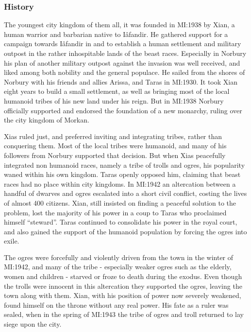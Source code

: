 \subsubsection{History}

The youngest city kingdom of them all, it was founded in MI:1938 by Xian, a
human warrior and barbarian native to Iâfandir. He gathered support for a
campaign towards Iâfandir in  and 
to establish a human settlement and military outpost in the rather
inhospitable lands of the beast races. Especially in Norbury his plan of
another military outpost against the invasion was well received, and liked
among both nobility and the general populace. He sailed from the shores of
Norbury with his friends and allies Arissa, and Taras in MI:1930. It took Xian
eight years to build a small settlement, as well as bringing most of the local
humanoid tribes of his new land under his reign. But in MI:1938 Norbury
officially supported and endorsed the foundation of a new monarchy, ruling
over the city kingdom of Morkan.

Xias ruled just, and preferred inviting and integrating tribes, rather than
conquering them. Most of the local tribes were humanoid, and many of his
followers from Norbury supported that decision. But when Xias peacefully
integrated non humanoid races, namely a tribe of trolls and ogres, his
popularity waned within his own kingdom. Taras openly opposed him, claiming
that beast races had no place within city kingdoms. In MI:1942 an
altercation between a handful of dwarves and ogres escalated into a short
civil conflict, costing the lives of almost 400 citizens. Xian, still insisted
on finding a peaceful solution to the problem, lost the majority of his power
in a coup to Taras who proclaimed himself ``steward''. Taras continued to
consolidate his power in the royal court, and also gained the support of the
humanoid population by forcing the ogres into exile.

The ogres were forcefully and violently driven from the town in the winter of
MI:1942, and many of the tribe - especially weaker ogres such as the
elderly, women and children - starved or froze to death during the exodus. Even
though the trolls were innocent in this altercation they supported the ogres,
leaving the town along with them. Xian, with his position of power now
severely weakened, found himself on the throne without any real power. His
fate as a ruler was sealed, when in the spring of MI:1943 the tribe of
ogres and troll returned to lay siege upon the city.

